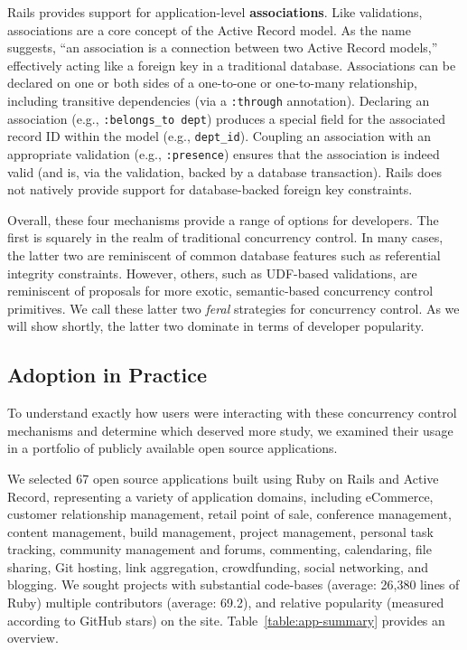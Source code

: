 \begin{myenumerate}
\item Rails provides support for application-level
\textbf{associations}. Like validations, associations are a core
concept of the Active Record model. As the name suggests, ``an
association is a connection between two Active Record models,''
effectively acting like a foreign key in a traditional
database. Associations can be declared on one or both sides of a
one-to-one or one-to-many relationship, including transitive
dependencies (via a \texttt{:through} annotation). Declaring an
association (e.g., \texttt{:belongs\_to dept}) produces a special field
for the associated record ID within the model (e.g.,
\texttt{dept\_id}). Coupling an association with an appropriate
validation (e.g., \texttt{:presence}) ensures that the association is
indeed valid (and is, via the validation, backed by a database
transaction). Rails does not natively provide support for
database-backed foreign key constraints.
\end{myenumerate}

Overall, these four mechanisms provide a range of options for
developers. The first is squarely in the realm of traditional
concurrency control. In many cases, the latter two are reminiscent of
common database features such as referential integrity
constraints. However, others, such as UDF-based validations, are
reminiscent of proposals for more exotic, semantic-based concurrency
control primitives. We call these latter two \textit{feral} strategies
for concurrency control. As we will show shortly, the latter two
dominate in terms of developer popularity.

\subsection{Adoption in Practice}

To understand exactly how users were interacting with these
concurrency control mechanisms and determine which deserved more
study, we examined their usage in a portfolio of publicly available
open source applications.

 We selected 67 open source applications
built using Ruby on Rails and Active Record, representing a variety of
application domains, including eCommerce, customer relationship
management, retail point of sale, conference management, content
management, build management, project management, personal task
tracking, community management and forums, commenting, calendaring,
file sharing, Git hosting, link aggregation, crowdfunding, social
networking, and blogging. We sought projects with substantial
code-bases (average: 26,380 lines of Ruby) multiple contributors
(average: 69.2), and relative popularity (measured according to GitHub
stars) on the site. Table~\ref{table:app-summary} provides an
overview.


